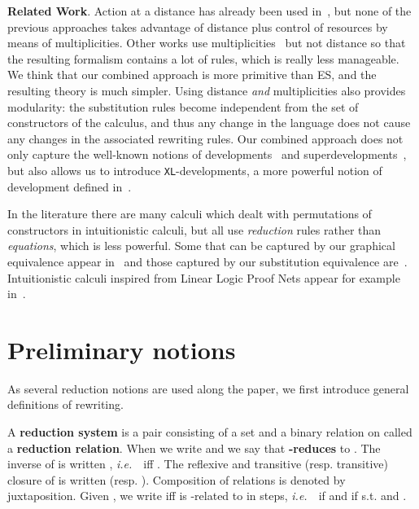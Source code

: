 \documentclass{LMCS}
\newcommand{\ie}{{\it  i.e.}~}
\renewcommand{\>}{\rightarrow}
\newcommand{\deft}[1]{{\bf #1}}
\newcommand{\development}{development}
\newcommand{\supersuperdevelopment}{{\tt XL}-\development}
\begin{document}
\deft{Related Work}.  Action at a distance has already been used
in~\cite{Milner07,deBruijn87,Ned92}, but none of the previous
approaches takes advantage of distance plus control of resources by
means of multiplicities.  Other works use multiplicities~\cite{KR09}
but not distance so that the resulting formalism contains a lot of
rules, which is really less manageable.  We think that our combined
approach is more primitive than ES, and the resulting theory is much
simpler.  Using distance \textit{and} multiplicities also provides
modularity: the substitution rules become independent from the set of
constructors of the calculus, and thus any change in the language does
not cause any changes in the associated rewriting rules. Our combined
approach does not only capture the well-known notions of
developments~\cite{Hindley78} and superdevelopments~\cite{KvOvR93}, but also allows us to
introduce \supersuperdevelopment s, a more powerful
notion of development defined in~\cite{AK10}.

In the literature there are many calculi which dealt with permutations
of constructors in intuitionistic calculi, but all use \textit{reduction} rules
rather than \textit{equations}, which is less powerful. 
Some  that can be captured by our graphical equivalence appear
in~\cite{Kamareddine00, regnier94,KfouryW95}
and those captured by our substitution equivalence
are~\cite{espiritoSanto2011,HZ09,Yoshida93}.
Intuitionistic calculi inspired from Linear Logic Proof Nets
appear for example in~\cite{KL05,Kes09,KR09}.

\section{Preliminary notions}
\label{sec:general-notion}

As several reduction notions are used along the paper, we first
introduce general definitions of rewriting. \medskip 

A \deft{reduction system} is a pair  consisting of a set 
and a binary relation  on  called a \deft{reduction relation}. When  we write
 and we say that  \deft{-reduces} to . 
The inverse of  is written
, \ie\  iff
. The reflexive and transitive (resp. transitive) closure
of  is written  (resp. ). Composition
of relations is denoted by juxtaposition. 
 Given , we write  iff 
 is -related to  in  steps, \ie\  if  and  if  s.t.   and . 
\end{document}
